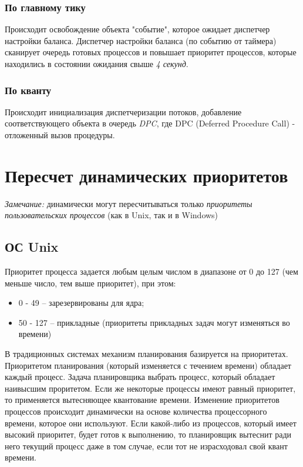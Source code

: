 \subsection{По главному тику}

Происходит освобождение объекта "событие", которое ожидает диспетчер настройки баланса.
Диспетчер настройки баланса (по событию от таймера) сканирует очередь готовых процессов и повышает приоритет процессов, которые находились в состоянии ожидания свыше \textit{4 секунд}.

\subsection{По кванту}

Происходит инициализация диспетчеризации потоков, добавление соответствующего объекта в очередь \textit{DPC}, где DPC (Deferred Procedure Call) - отложенный вызов процедуры.


\chapter{Пересчет динамических приоритетов}

\textit{Замечание:} динамически могут пересчитываться только \textit{приоритеты пользовательских процессов} (как в Unix, так и в Windows)

\section{ОС Unix}

Приоритет процесса задается любым целым числом в диапазоне от 0 до 127 (чем меньше число, тем выше приоритет), при этом:

\begin{itemize}
    \item 0 - 49 -- зарезервированы для ядра;
    \item 50 - 127 -- прикладные (приоритеты прикладных задач могут изменяться во времени)
\end{itemize}

В традиционных системах механизм планирования базируется на приоритетах. Приоритетом планирования (который изменяется с течением времени) обладает каждый процесс. Задача планировщика выбрать процесс, который обладает наивысшим проритетом. Если же некоторые процессы имеют равный приоритет, то применяется вытесняющее квантование времени. Изменение приоритетов процессов происходит динамически на основе количества процессорного времени, которое они используют. Если какой-либо из процессов, который имеет высокий приоритет, будет готов к выполнению, то планировщик вытеснит ради него текущий процесс даже в том случае, если тот не израсходовал свой квант времени.

